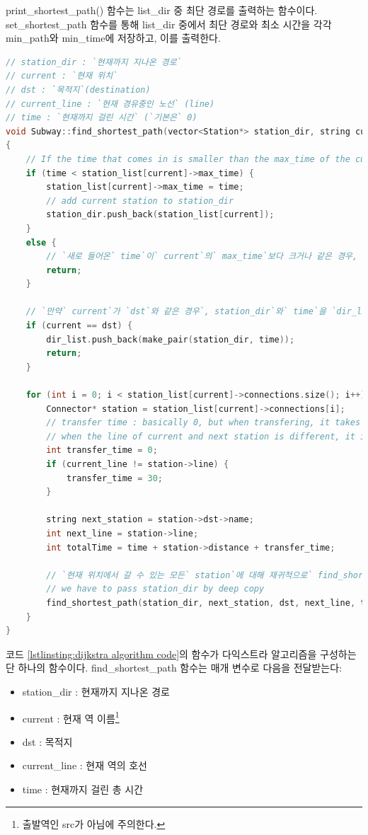 \documentclass{article}
\begin{document}
print\_shortest\_path() 함수는 list\_dir 중 최단 경로를 출력하는 함수이다. set\_shortest\_path 함수를 통해 list\_dir 중에서 최단 경로와 최소 시간을 각각 min\_path와 min\_time에 저장하고, 이를 출력한다.

\begin{lstlisting}[language=C++, escapeinside=``, caption={다익스트라 알고리즘 구현}, label={lstlinsting:dijkstra algorithm code}]
// station_dir : `현재까지 지나온 경로`
// current : `현재 위치`
// dst : `목적지`(destination)
// current_line : `현재 경유중인 노선` (line)
// time : `현재까지 걸린 시간` (`기본은` 0)
void Subway::find_shortest_path(vector<Station*> station_dir, string current, string dst, int current_line, int time = 0)
{
	// If the time that comes in is smaller than the max_time of the current, change the max_time of the current station to time.
	if (time < station_list[current]->max_time) {
		station_list[current]->max_time = time;
		// add current station to station_dir
		station_dir.push_back(station_list[current]);
	}
	else {
		// `새로 들어온` time`이` current`의` max_time`보다 크거나 같은 경우, 더 이상 진행하지 않는다.`
		return;
	}
	
	// `만약` current`가 `dst`와 같은 경우`, station_dir`와` time`을 `dir_list`에 추가한다.`
	if (current == dst) {
		dir_list.push_back(make_pair(station_dir, time));
		return;
	}
	
	for (int i = 0; i < station_list[current]->connections.size(); i++) {
		Connector* station = station_list[current]->connections[i];
		// transfer time : basically 0, but when transfering, it takes 30 seconds
		// when the line of current and next station is different, it is a transfer station
		int transfer_time = 0;
		if (current_line != station->line) {
			transfer_time = 30;
		}
		
		string next_station = station->dst->name;
		int next_line = station->line;
		int totalTime = time + station->distance + transfer_time;

		// `현재 위치에서 갈 수 있는 모든` station`에 대해 재귀적으로` find_shortest_path`를 호출한다.`
		// we have to pass station_dir by deep copy
		find_shortest_path(station_dir, next_station, dst, next_line, totalTime);
	}
}
\end{lstlisting}

코드 \ref{lstlinsting:dijkstra algorithm code}의 함수가 다익스트라 알고리즘을 구성하는 단 하나의 함수이다. find\_shortest\_path 함수는 매개 변수로 다음을 전달받는다:
\begin{itemize}
    \item station\_dir : 현재까지 지나온 경로
    \item current : 현재 역 이름\footnote{출발역인 src가 아님에 주의한다.}
    \item dst : 목적지
    \item current\_line : 현재 역의 호선
    \item time : 현재까지 걸린 총 시간
\end{itemize}
\end{document}
